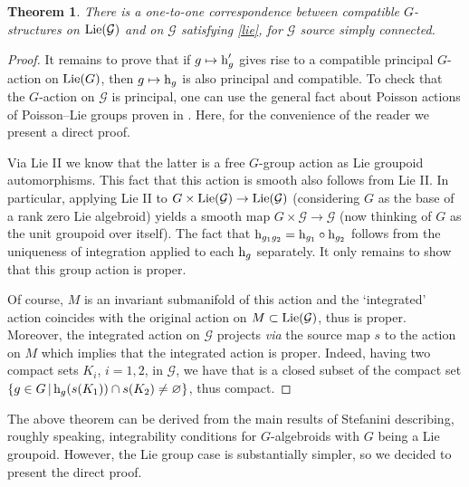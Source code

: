 \documentclass[pdftex]{sigma}
\newcommand{\rmh}{\textnormal{h}}
\newcommand{\Lie}{\textnormal{Lie}}
\def\cG{\mathcal{G}}
\numberwithin{equation}{section}
\newtheorem{Theorem}{Theorem}[section]
\begin{document}
 \begin{Theorem}\label{thm:lie theory01}
There is a one-to-one correspondence between compatible $G$-structures on $\Lie(\mathcal{G})$ and on $\mathcal{G}$ satisfying \eqref{lie}, for $\mathcal{G}$ source simply connected.
\end{Theorem}

\begin{proof}
It remains to prove that if $g\mapsto \rmh'_g$ gives rise to a compatible principal $G$-action on $\Lie(G)$, then $g\mapsto \rmh_g$ is also principal and compatible. To check that the $G$-action on $\mathcal{G}$ is principal, one can use the general fact about Poisson actions of Poisson--Lie groups proven in \cite[proof of Proposition~3.1]{Fernandes:2009}. Here, for the convenience of the reader we present a direct proof.

Via Lie II we know that the latter is a free $G$-group action as Lie groupoid automorphisms. This fact that this action is smooth also follows from Lie II. In particular, applying Lie II to $G \times \Lie(\cG) \rightarrow \Lie(\cG)$ (considering $G$ as the base of a rank zero Lie algebroid) yields a smooth map $G \times \cG \rightarrow \cG$ (now thinking of $G$ as the unit groupoid over itself). The fact that $\rmh_{g_1 g_2} = \rmh_{g_1} \circ \rmh_{g_2}$ follows from the uniqueness of integration applied to each $\rmh_g$ separately. It only remains to show that this group action is proper.

Of course, $M$ is an invariant submanifold of this action and the `integrated' action coincides with the original action on $M\subset \Lie(\cG)$, thus is proper. Moreover, the integrated action on $\mathcal{G}$ projects \emph{via} the source map $s$ to the action on $M$ which implies that the integrated action is proper. Indeed, having two compact sets $K_i$, $i=1,2$, in $\cG$, we have that \smash{$\{ g\in G\, |\, \rmh_g(K_1)\cap K_2\ne\varnothing\}$} is a closed subset of the compact set $\{ g\in G\, |\, \rmh_g(s(K_1))\cap s(K_2)\ne\varnothing\}$, thus compact.
\end{proof}

\begin{Remark}
The above theorem can be derived from the main results of Stefanini \cite{Stefanini:2007,Stefanini:2008} describing, roughly speaking, integrability conditions for $G$-algebroids with $G$ being a Lie groupoid. However, the Lie group case is substantially simpler, so we decided to present the direct proof.
\end{Remark}
\end{document}
